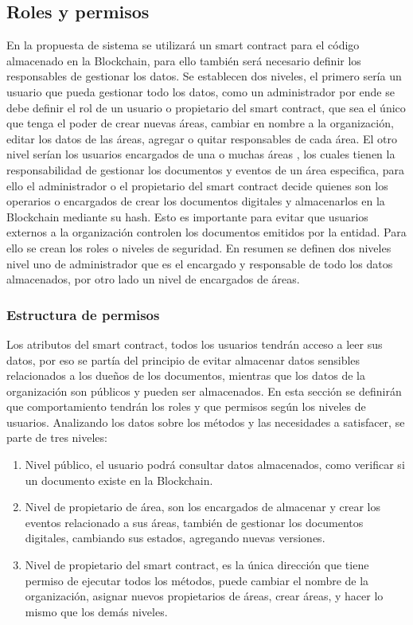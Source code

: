     \subsection{Roles y permisos}
    En la propuesta de sistema se utilizará un smart contract para el código almacenado en la Blockchain,
    para ello también será necesario definir los responsables de gestionar los datos.
    Se establecen dos niveles, el primero sería un usuario que pueda gestionar todo los datos, como un administrador 
    por ende se debe definir el rol de un usuario o propietario del smart contract, que sea el único que tenga el poder de crear nuevas áreas,
    cambiar en nombre a la organización, editar los datos de las áreas, agregar o quitar responsables de cada área. 
    El otro nivel serían los usuarios encargados de una o muchas  áreas , los cuales tienen la responsabilidad de gestionar los documentos y eventos de un área especifica,
    para ello el administrador o el propietario del smart contract decide quienes son los operarios o encargados de crear los documentos digitales y almacenarlos en la  Blockchain mediante
    su hash.
    Esto es importante para evitar que usuarios externos a la organización controlen los documentos emitidos por la entidad. Para ello se crean los roles o niveles de seguridad.
    En resumen se definen dos niveles nivel uno de administrador que es el encargado y responsable de todo los datos almacenados, por otro lado un nivel de encargados de  áreas.
  \subsubsection{Estructura de permisos}
  Los atributos del smart contract, todos los usuarios tendrán acceso a leer sus datos, por eso se partía del principio de evitar almacenar datos sensibles relacionados
  a los dueños de los documentos, mientras que los datos de la organización son públicos y pueden ser almacenados. 
  En esta sección se definirán que comportamiento tendrán los roles y que permisos según los niveles de usuarios. Analizando los datos sobre los métodos y las necesidades 
  a satisfacer, se parte de tres niveles: 
  \begin{enumerate}
    \item Nivel público, el usuario podrá consultar datos almacenados, como verificar si un documento existe en la Blockchain.
    \item Nivel de propietario de área, son los encargados de almacenar y crear los eventos relacionado a sus áreas, también de gestionar los documentos digitales, cambiando sus estados,
    agregando nuevas versiones.
    \item Nivel de propietario del smart contract, es la única dirección que tiene permiso de ejecutar todos los métodos, puede cambiar el nombre de la organización,
    asignar nuevos propietarios de áreas, crear áreas, y hacer lo mismo que los demás niveles. 
  \end{enumerate}
  
